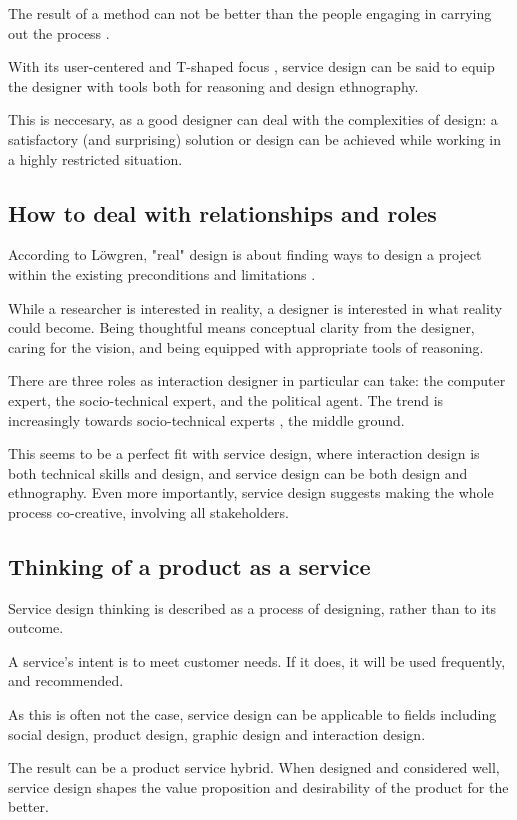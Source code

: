 The result of a method can not be better than the people engaging in carrying out the process \cite{lowgren}.

With its user-centered and T-shaped focus \cite{stickdorn}, service design can be said to equip the designer with tools both for reasoning and design ethnography.

This is neccesary, as a good designer can deal with the complexities of design: a satisfactory (and surprising) solution or design can be achieved while working in a highly restricted situation.

\subsection{How to deal with relationships and roles}
According to Löwgren, "real" design is about finding ways to design a project within the existing preconditions and limitations \cite{lowgren}.

While a researcher is interested in reality, a designer is interested in what reality could become. \cite{lowgren} Being thoughtful means conceptual clarity from the designer, caring for the vision, and being equipped with appropriate tools of reasoning.

There are three roles as interaction designer in particular can take: the computer expert, the socio-technical expert, and the political agent. The trend is increasingly towards socio-technical experts \cite{lowgren}, the middle ground.

This seems to be a perfect fit with service design, where interaction design is both technical skills and design, and service design can be both design and ethnography. Even more importantly, service design suggests making the whole process co-creative, involving all stakeholders. \cite{stickdorn}

\subsection{Thinking of a product as a service}

Service design thinking is described as a process of designing, rather than to its outcome.

A service's intent is to meet customer needs. If it does, it will be used frequently, and recommended. \cite{stickdorn}

As this is often not the case, service design can be applicable to fields including social design, product design, graphic design and interaction design.

The result can be a product service hybrid. When designed and considered well, service design shapes the value proposition and desirability of the product for the better.


